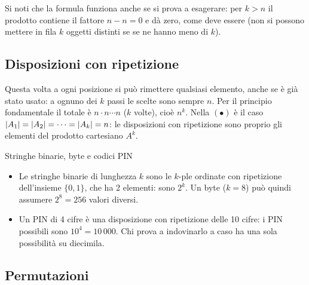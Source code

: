 Si noti che la formula funziona anche se si prova a esagerare: per $k > n$ il prodotto contiene il fattore
$n - n = 0$ e dà zero, come deve essere (non si possono mettere in fila $k$ oggetti distinti se se ne hanno meno di
$k$).

\subsection{Disposizioni con ripetizione}



\begin{dimostrazione}
 Questa volta a ogni posizione si può rimettere qualsiasi elemento, anche se è già
stato usato: a ognuno dei $k$ passi le scelte sono sempre $n$.
 Per il principio fondamentale il totale è $n \cdot n \cdots n$ ($k$ volte), cioè $n^k$. Nella
$(\bullet)$ è il caso $\left\lvert A_1 \right\rvert = \left\lvert A_2 \right\rvert = \cdots = \left\lvert A_k \right\rvert = n$: le disposizioni con ripetizione sono
proprio gli elementi del prodotto cartesiano $A^k$.
\end{dimostrazione}

\begin{esempio}{Stringhe binarie, byte e codici PIN}
\begin{itemize}
  \item Le stringhe binarie di lunghezza $k$ sono le $k$-ple ordinate con ripetizione dell'insieme $\{0, 1\}$, che ha
        2 elementi: sono $2^k$. Un byte ($k = 8$) può quindi assumere $2^8 = 256$ valori diversi.
  \item Un PIN di 4 cifre è una disposizione con ripetizione delle 10 cifre: i PIN possibili sono $10^4 = 10\,000$.
        Chi prova a indovinarlo a caso ha una sola possibilità su diecimila.
\end{itemize}
\end{esempio}

\subsection{Permutazioni}

